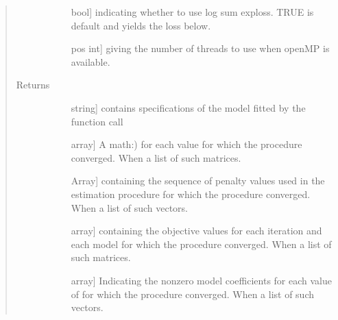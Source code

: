 \documentclass[letterpaper,10pt,english]{sphinxmanual}
\begin{document}
\begin{fulllineitems}
\begin{quote}
\begin{description}
\begin{description}
\item[{}] \leavevmode{[}bool{]}
\sphinxAtStartPar
indicating whether to use log sum exp\sphinxhyphen{}loss.  TRUE is
default and yields the loss below.

\item[{}] \leavevmode{[}pos int{]}
\sphinxAtStartPar
giving the number of threads to use when  openMP  is available.

\end{description}

\item[{Returns}] \leavevmode\begin{description}
\item[{}] \leavevmode{[}string{]}
\sphinxAtStartPar
contains specifications of the model fitted by the function call

\item[{}] \leavevmode{[}array{]}
\sphinxAtStartPar
A math:) for each   \sphinxhyphen{}value
for which the procedure converged. When   
a   \sphinxhyphen{}list of such matrices.

\item[{}] \leavevmode{[}Array{]}
\sphinxAtStartPar
containing the sequence of penalty values used
in the estimation procedure for which the procedure converged.
When    a   \sphinxhyphen{}list of such vectors.

\item[{}] \leavevmode{[}array{]}
\sphinxAtStartPar
containing the objective values for each
iteration and each model for which the procedure converged.
When    a   \sphinxhyphen{}list of such matrices.

\item[{}] \leavevmode{[}array{]}
\sphinxAtStartPar
Indicating the nonzero model coefficients for each
value of    for which the procedure converged. When
 a   \sphinxhyphen{}list of such vectors.


\end{description}
\end{description}
\end{quote}
\end{fulllineitems}
\end{document}
